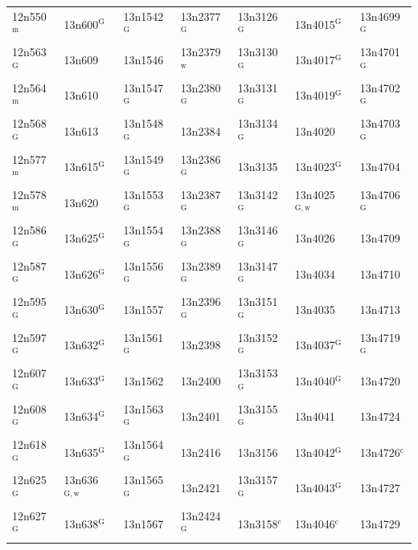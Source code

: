 \documentclass[12pt, oneside]{amsart}
\begin{document}
{\begin{longtable}{*{7}{>{\raggedright\arraybackslash}p{}}}
12n550$^{\mathrm{m}}$ & 13n600$^{\mathrm{G}}$ & 13n1542$^{\mathrm{G}}$ & 13n2377$^{\mathrm{G}}$ & 13n3126$^{\mathrm{G}}$ & 13n4015$^{\mathrm{G}}$ & 13n4699$^{\mathrm{G}}$ \\
12n563$^{\mathrm{G}}$ & 13n609 & 13n1546 & 13n2379$^{\mathrm{w}}$ & 13n3130$^{\mathrm{G}}$ & 13n4017$^{\mathrm{G}}$ & 13n4701$^{\mathrm{G}}$ \\
12n564$^{\mathrm{m}}$ & 13n610 & 13n1547$^{\mathrm{G}}$ & 13n2380$^{\mathrm{G}}$ & 13n3131$^{\mathrm{G}}$ & 13n4019$^{\mathrm{G}}$ & 13n4702$^{\mathrm{G}}$ \\
12n568$^{\mathrm{G}}$ & 13n613 & 13n1548$^{\mathrm{G}}$ & 13n2384 & 13n3134$^{\mathrm{G}}$ & 13n4020 & 13n4703$^{\mathrm{G}}$ \\
12n577$^{\mathrm{m}}$ & 13n615$^{\mathrm{G}}$ & 13n1549$^{\mathrm{G}}$ & 13n2386$^{\mathrm{G}}$ & 13n3135 & 13n4023$^{\mathrm{G}}$ & 13n4704 \\
12n578$^{\mathrm{m}}$ & 13n620 & 13n1553$^{\mathrm{G}}$ & 13n2387$^{\mathrm{G}}$ & 13n3142$^{\mathrm{G}}$ & 13n4025$^{\mathrm{G,w}}$ & 13n4706$^{\mathrm{G}}$ \\
12n586$^{\mathrm{G}}$ & 13n625$^{\mathrm{G}}$ & 13n1554$^{\mathrm{G}}$ & 13n2388$^{\mathrm{G}}$ & 13n3146$^{\mathrm{G}}$ & 13n4026 & 13n4709 \\
12n587$^{\mathrm{G}}$ & 13n626$^{\mathrm{G}}$ & 13n1556$^{\mathrm{G}}$ & 13n2389$^{\mathrm{G}}$ & 13n3147$^{\mathrm{G}}$ & 13n4034 & 13n4710 \\
12n595$^{\mathrm{G}}$ & 13n630$^{\mathrm{G}}$ & 13n1557 & 13n2396$^{\mathrm{G}}$ & 13n3151$^{\mathrm{G}}$ & 13n4035 & 13n4713 \\
12n597$^{\mathrm{G}}$ & 13n632$^{\mathrm{G}}$ & 13n1561$^{\mathrm{G}}$ & 13n2398 & 13n3152$^{\mathrm{G}}$ & 13n4037$^{\mathrm{G}}$ & 13n4719$^{\mathrm{G}}$ \\
12n607$^{\mathrm{G}}$ & 13n633$^{\mathrm{G}}$ & 13n1562 & 13n2400 & 13n3153$^{\mathrm{G}}$ & 13n4040$^{\mathrm{G}}$ & 13n4720 \\
12n608$^{\mathrm{G}}$ & 13n634$^{\mathrm{G}}$ & 13n1563$^{\mathrm{G}}$ & 13n2401 & 13n3155$^{\mathrm{G}}$ & 13n4041 & 13n4724 \\
12n618$^{\mathrm{G}}$ & 13n635$^{\mathrm{G}}$ & 13n1564$^{\mathrm{G}}$ & 13n2416 & 13n3156 & 13n4042$^{\mathrm{G}}$ & 13n4726$^{\mathrm{c}}$ \\
12n625$^{\mathrm{G}}$ & 13n636$^{\mathrm{G,w}}$ & 13n1565$^{\mathrm{G}}$ & 13n2421 & 13n3157$^{\mathrm{G}}$ & 13n4043$^{\mathrm{G}}$ & 13n4727 \\
12n627$^{\mathrm{G}}$ & 13n638$^{\mathrm{G}}$ & 13n1567 & 13n2424$^{\mathrm{G}}$ & 13n3158$^{\mathrm{c}}$ & 13n4046$^{\mathrm{c}}$ & 13n4729 \\

\end{longtable}}
\end{document}
